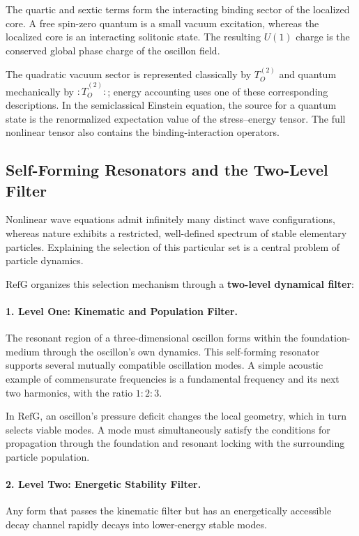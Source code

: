 \documentclass[11pt,a4paper]{article}
\newcommand{\RefG}{\mathrm{RefG}}
\begin{document}
The quartic and sextic terms form the interacting binding sector of the localized core. A free spin-zero quantum is a small vacuum excitation, whereas the localized core is an interacting solitonic state. The resulting $U(1)$ charge is the conserved global phase charge of the oscillon field.

The quadratic vacuum sector is represented classically by $T_O^{(2)}$ and quantum mechanically by $:\widehat T_O^{(2)}:$; energy accounting uses one of these corresponding descriptions. In the semiclassical Einstein equation, the source for a quantum state is the renormalized expectation value of the stress--energy tensor. The full nonlinear tensor also contains the binding-interaction operators.

\subsection{Self-Forming Resonators and the Two-Level Filter}

Nonlinear wave equations admit infinitely many distinct wave configurations, whereas nature exhibits a restricted, well-defined spectrum of stable elementary particles. Explaining the selection of this particular set is a central problem of particle dynamics.

$\RefG$ organizes this selection mechanism through a \textbf{two-level dynamical filter}:

\paragraph{1. Level One: Kinematic and Population Filter.} The resonant region of a three-dimensional oscillon forms within the foundation-medium through the oscillon's own dynamics. This self-forming resonator supports several mutually compatible oscillation modes. A simple acoustic example of commensurate frequencies is a fundamental frequency and its next two harmonics, with the ratio $1:2:3$.

In $\RefG$, an oscillon's pressure deficit changes the local geometry, which in turn selects viable modes. A mode must simultaneously satisfy the conditions for propagation through the foundation and resonant locking with the surrounding particle population.

\paragraph{2. Level Two: Energetic Stability Filter.} Any form that passes the kinematic filter but has an energetically accessible decay channel rapidly decays into lower-energy stable modes.
\end{document}
